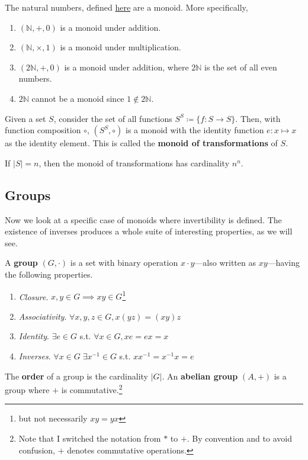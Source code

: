   \begin{example}
    The natural numbers, defined \hyperref[st-naturals]{here} are a monoid. More specifically, 
    \begin{enumerate}
      \item $(\mathbb{N}, +, 0)$ is a monoid under addition. 
      \item $(\mathbb{N}, \times, 1)$ is a monoid under multiplication. 
      \item $(2\mathbb{N}, +, 0)$ is a monoid under addition, where $2\mathbb{N}$ is the set of all even numbers. 
      \item $2\mathbb{N}$ cannot be a monoid since $1 \not\in 2\mathbb{N}$. 
    \end{enumerate}
  \end{example}

  \begin{definition}
    Given a set $S$, consider the set of all functions $S^S \coloneqq \{f: S \rightarrow S\}$. Then, with function composition $\circ$, $(S^S, \circ)$ is a monoid with the identity function $e: x \mapsto x$ as the identity element. This is called the \textbf{monoid of transformations} of $S$. 
  \end{definition} 

  \begin{theorem}
    If $|S| = n$, then the monoid of transformations has cardinality $n^n$. 
  \end{theorem}

\subsection{Groups} 

  Now we look at a specific case of monoids where invertibility is defined. The existence of inverses produces a whole suite of interesting properties, as we will see. 
  
  \begin{definition}[Group]
    A \textbf{group} $(G, \cdot)$ is a set with binary operation $x \cdot y$---also written as $xy$---having the following properties.
    \begin{enumerate}
      \item \textit{Closure}. $x, y \in G \implies xy \in G$\footnote{but not necessarily $xy  = yx$}
      \item \textit{Associativity}. $\forall x, y, z \in G, x(yz) = (xy)z$
      \item \textit{Identity}. $\exists e \in G$ s.t. $\forall x \in G, xe = ex = x$
      \item \textit{Inverses}. $\forall x \in G \; \exists x^{-1} \in G$ s.t. $x x^{-1} = x^{-1} x = e$
    \end{enumerate}
    The \textbf{order} of a group is the cardinality $|G|$. An \textbf{abelian group} $(A, +)$ is a group where $+$ is commutative.\footnote{Note that I switched the notation from $\ast$ to $+$. By convention and to avoid confusion, $+$ denotes commutative operations. }
  \end{definition} 

